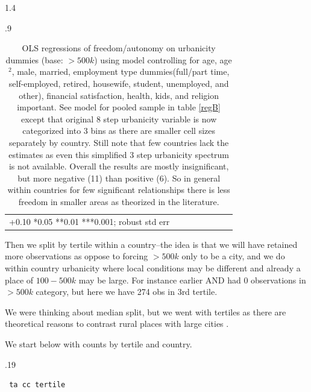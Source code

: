 \documentclass[10pt, letterpaper]{article}
\begin{document}
\begin{spacing}{1.4}
\begin{spacing}{.9} \begin{table}[H]\centering   \begin{scriptsize}
\begin{tabular}{p{1.8in}p{.5in}p{.5in}p{.5in}p{.5in}p{.5in}p{.5in}p{.5in}}\hline

\hline +0.10 *0.05 **0.01 ***0.001; robust std err
\end{tabular}\end{scriptsize}\caption{\label{regCC1mod}
OLS regressions of freedom/autonomy on urbanicity dummies (base: $>500k$) using model controlling for age, age$^2$, male,
married, employment type dummies(full/part time, self-employed, retired,
housewife, student, unemployed, and other), financial satisfaction, health, kids,
and religion important.  See model for pooled sample in table \ref{regB} except that
original 8 step urbanicity variable is now categorized into 3 bins as there are
smaller cell sizes separately by country.
%
 Still note that few countries lack the estimates as even
this simplified 3 step urbanicity spectrum is not available. 
Overall the results are mostly insignificant,
but more negative (11) than positive (6). So in general within countries for few
significant relationships there is less freedom in
smaller areas as theorized in the literature. }
\end{table} \end{spacing}

Then we split by tertile within a country--the idea is that we will have
retained more observations as oppose to forcing $>500k$ only to be a city, and
we do within country urbanicity where local conditions may be different and
already a place of $100-500k$ may be large. For instance earlier AND had 0
observations in $>500k$ category, but here we have 274 obs in 3rd tertile. 

We were thinking about median split, %
 but we went with tertiles as there are theoretical reasons to contrast rural
 places with large cities \citep{aok-ls_fisher16,aokCityBook15}.

We start below with counts by tertile and country.

\begin{scriptsize}
\begin{spacing}{.19} 
\begin{verbatim}
 ta cc tertile


\end{verbatim}
\end{spacing}
\end{scriptsize}
\end{spacing}
\end{document}
